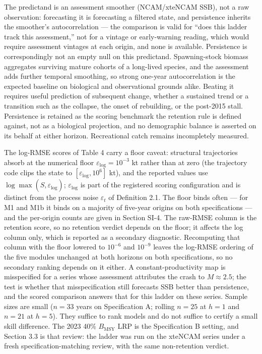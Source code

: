 \documentclass[11pt]{article}
\begin{document}
The predictand is an assessment smoother (NCAM/xteNCAM SSB), not a raw
observation: forecasting it is forecasting a filtered state, and
persistence inherits the smoother's autocorrelation --- the comparison
is valid for ``does this ladder track this assessment,'' not for a
vintage or early-warning reading, which would require assessment
vintages at each origin, and none is available. Persistence is
correspondingly not an empty null on this predictand. Spawning-stock
biomass aggregates surviving mature cohorts of a long-lived species, and
the assessment adds further temporal smoothing, so strong one-year
autocorrelation is the expected baseline on biological and observational
grounds alike. Beating it requires useful prediction of subsequent change, whether a
sustained trend or a transition such as the collapse, the onset of
rebuilding, or the post-2015 stall. Persistence is retained as the scoring benchmark the retention rule is
defined against, not as a biological projection, and no demographic
balance is asserted on its behalf at either horizon.
Recreational catch remains incompletely measured.

The log-RMSE scores of Table 4 carry a floor caveat: structural
trajectories absorb at the numerical floor
\(\varepsilon_{\mathrm{log}} = 10^{-3}\) kt rather than at zero (the
trajectory code clips the state to
\([\varepsilon_{\mathrm{log}}, 10^{6}]\) kt), and the reported values
use \(\log\max(\hat S, \varepsilon_{\mathrm{log}})\);
\(\varepsilon_{\mathrm{log}}\) is part of the registered scoring
configuration and is distinct from the process noise \(\varepsilon_t\)
of Definition 2.1. The floor binds often --- for M1 and M1b it binds on a majority of
five-year origins on both specifications --- and the per-origin counts
are given in Section SI-4. The raw-RMSE column is the retention score, so no retention verdict
depends on the floor; it affects the log column only, which is reported
as a secondary diagnostic. Recomputing that column with the floor
lowered to \(10^{-6}\) and \(10^{-9}\) leaves the log-RMSE ordering of
the five modules unchanged at both horizons on both specifications, so
no secondary ranking depends on it either. A constant-productivity map is
misspecified for a series whose assessment attributes the crash to
\(M \approx 2.5\); the test is whether that misspecification still
forecasts SSB better than persistence, and the scored comparison answers
that for this ladder on these series. Sample sizes are small
(\(n=33\) years on Specification A; rolling \(n=25\) at \(h=1\) and
\(n=21\) at \(h=5\)). They suffice to rank models and do not suffice to
certify a small skill difference. The 2023 40\% \(B_{\mathrm{MSY}}\) LRP
is the Specification B setting, and Section 3.3 is that review: the
ladder was run on the xteNCAM series under a fresh
specification-matching review, with the same non-retention verdict.
\end{document}

